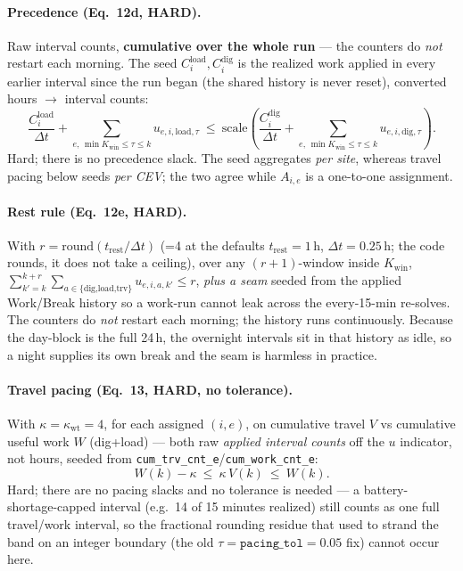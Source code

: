 \documentclass[11pt]{article}
\newcommand{\dt}{\Delta t}
\begin{document}
\paragraph{Precedence (Eq.\ 12d, HARD).}
Raw interval counts, \textbf{cumulative over the whole run} --- the counters do \emph{not} restart
each morning. The seed $C^{\text{load}}_i,C^{\text{dig}}_i$ is the realized work applied in every
earlier interval since the run began (the shared history is never reset), converted hours
$\to$ interval counts:
\begin{equation}
\frac{C^{\text{load}}_i}{\dt}+\!\!\sum_{e,\,\min K_{\text{win}}\le\tau\le k}\!\!u_{e,i,\text{load},\tau}
\ \le\ \text{scale}\left(\frac{C^{\text{dig}}_i}{\dt}+\!\!\sum_{e,\,\min K_{\text{win}}\le\tau\le k}\!\!u_{e,i,\text{dig},\tau}\right).
\end{equation}
Hard; there is no precedence slack. The seed aggregates \emph{per site}, whereas travel pacing
below seeds \emph{per CEV}; the two agree while $A_{i,e}$ is a one-to-one assignment.

\paragraph{Rest rule (Eq.\ 12e, HARD).}
With $r=\mathrm{round}(t_{\text{rest}}/\dt)$ (=4 at the defaults $t_{\text{rest}}=1$\,h,
$\dt=0.25$\,h; the code rounds, it does not take a ceiling), over any $(r{+}1)$-window inside
$K_{\text{win}}$,
$\sum_{k'=k}^{k+r}\sum_{a\in\{\text{dig,load,trv}\}}u_{e,i,a,k'}\le r$, \emph{plus a seam} seeded
from the applied Work/Break history so a work-run cannot leak across the every-15-min re-solves.
The counters do \emph{not} restart each morning; the history runs continuously. Because the
day-block is the full 24\,h, the overnight intervals sit in that history as idle, so a night
supplies its own break and the seam is harmless in practice.

\paragraph{Travel pacing (Eq.\ 13, HARD, no tolerance).}
With $\kappa=\kappa_{\text{wt}}=4$, for each assigned $(i,e)$, on cumulative travel $V$ vs
cumulative useful work $W$ (dig+load) --- both raw \emph{applied interval counts} off the $u$
indicator, not hours, seeded from \texttt{cum\_trv\_cnt\_e}/\texttt{cum\_work\_cnt\_e}:
\begin{equation}
W(k)-\kappa\ \le\ \kappa\,V(k)\ \le\ W(k).
\end{equation}
Hard; there are no pacing slacks and no tolerance is needed --- a battery-shortage-capped interval
(e.g.\ 14 of 15 minutes realized) still counts as one full travel/work interval, so the fractional
rounding residue that used to strand the band on an integer boundary (the old $\tau =
\texttt{pacing\_tol} = 0.05$ fix) cannot occur here.
\end{document}
